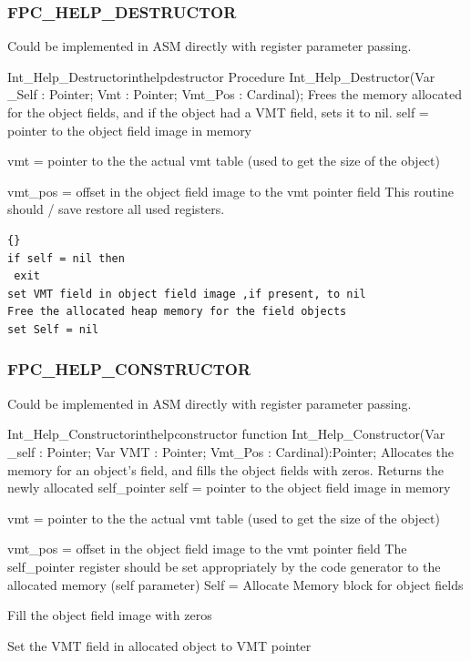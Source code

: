 \documentclass [a4paper,12pt]{article}
\begin{document}
\subsubsection{FPC{\_}HELP{\_}DESTRUCTOR}
\label{subsubsec:mylabel82}

Could be implemented in ASM directly with register parameter passing.

\begin{procedurel}{Int{\_}Help{\_}Destructor}{inthelpdestructor}
\Declaration
Procedure Int{\_}Help{\_}Destructor(Var {\_}Self : Pointer; Vmt : Pointer; Vmt{\_}Pos : Cardinal);
\Description
Frees the memory allocated for the object fields, and if the object had a
VMT field, sets it to nil.
\Parameters
self = pointer to the object field image in memory \par
vmt = pointer to the the actual vmt table (used to get the size of the object) \par
vmt{\_}pos = offset in the object field image to the vmt pointer field
\Notes
This routine should / save restore all used registers.
\Algorithm
\begin{lstlisting}{}
if self = nil then
 exit
set VMT field in object field image ,if present, to nil
Free the allocated heap memory for the field objects
set Self = nil
\end{lstlisting}
\end{procedurel}

\subsubsection{FPC{\_}HELP{\_}CONSTRUCTOR}
\label{subsubsec:mylabel83}

Could be implemented in ASM directly with register parameter passing.

\begin{functionl}{Int{\_}Help{\_}Constructor}{inthelpconstructor}
\Declaration
function Int{\_}Help{\_}Constructor(Var {\_}self : Pointer; Var VMT : Pointer; Vmt{\_}Pos : Cardinal):Pointer;
\Description
Allocates the memory for an object's field, and fills the object fields with
zeros. Returns the newly allocated self{\_}pointer
\Parameters
self = pointer to the object field image in memory \par
vmt = pointer to the the actual vmt table (used to get the size of the object) \par
vmt{\_}pos = offset in the object field image to the vmt pointer field
\Notes
The self{\_}pointer register should be set appropriately by the code
generator to the allocated memory (self parameter)
\Algorithm
Self = Allocate Memory block for object fields \par
Fill the object field image with zeros\par
Set the VMT field in allocated object to VMT pointer
\end{functionl}
\end{document}
